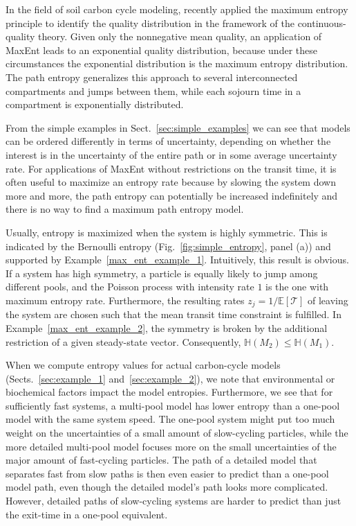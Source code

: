 \documentclass[smallextended]{svjour3}
\newcommand{\E}{\mathbb{E}}
\newcommand{\TT}{\mathcal{T}}
\renewcommand{\H}{\mathbb{H}}
\begin{document}
In the field of soil carbon cycle modeling, \citet{Agren2021BGC} recently applied the maximum entropy principle to identify the quality distribution in the framework of the continuous-quality theory.
Given only the nonnegative mean quality, an application of MaxEnt leads to an exponential quality distribution, because under these circumstances the exponential distribution is the maximum entropy distribution.
The path entropy generalizes this approach to several interconnected compartments and jumps between them, while each sojourn time in a compartment is exponentially distributed.

From the simple examples in Sect.~\ref{sec:simple_examples} we can see that models can be ordered differently in terms of uncertainty, depending on whether the interest is in the uncertainty of the entire path or in some average uncertainty rate.
For applications of MaxEnt without restrictions on the transit time, it is often useful to maximize an entropy rate because by slowing the system down more and more, the path entropy can potentially be increased indefinitely and there is no way to find a maximum path entropy model.

Usually, entropy is maximized when the system is highly symmetric.
This is indicated by the Bernoulli entropy (Fig.~\ref{fig:simple_entropy}, panel (a)) and supported by Example~\ref{max_ent_example_1}.
Intuitively, this result is obvious.
If a system has high symmetry, a particle is equally likely to jump among different pools, and the Poisson process with intensity rate $1$ is the one with maximum entropy rate.
Furthermore, the resulting rates $z_j = 1/\E\left[\TT\right]$ of leaving the system are chosen such that the mean transit time constraint is fulfilled. 
In Example~\ref{max_ent_example_2}, the symmetry is broken by the additional restriction of a given steady-state vector.
Consequently, $\H(M_2) \leq \H(M_1)$.

When we compute entropy values for actual carbon-cycle models (Sects.~\ref{sec:example_1} and~\ref{sec:example_2}), we note that environmental or biochemical factors impact the model entropies.
Furthermore, we see that for sufficiently fast systems, a multi-pool model has lower entropy than a one-pool model with the same system speed.
The one-pool system might put too much weight on the uncertainties of a small amount of slow-cycling particles, while the more detailed multi-pool model focuses more on the small uncertainties of the major amount of fast-cycling particles.
The path of a detailed model that separates fast from slow paths is then even easier to predict than a one-pool model path, even though the detailed model's path looks more complicated.
However, detailed paths of slow-cycling systems are harder to predict than just the exit-time in a one-pool equivalent.
\end{document}

